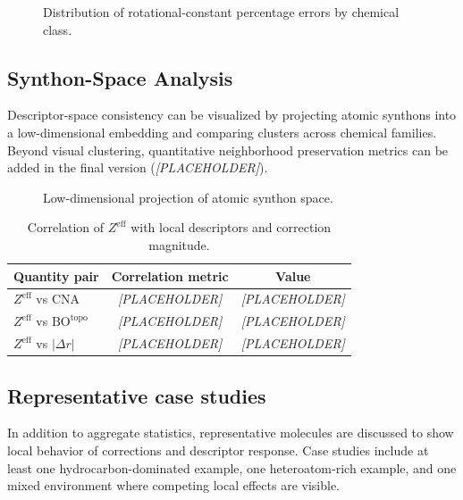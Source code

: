 \documentclass[journal=jctcce,manuscript=article]{achemso}
\begin{document}
\begin{figure}[ht]
\centering
{}
\caption{Distribution of rotational-constant percentage errors by chemical class.}
\label{fig:delta_by_bond_class}
\end{figure}

\subsection{Synthon-Space Analysis}
Descriptor-space consistency can be visualized by projecting atomic synthons into a low-dimensional embedding and comparing clusters across chemical families.
Beyond visual clustering, quantitative neighborhood preservation metrics can be added in the final version (\textit{[PLACEHOLDER]}).

\begin{figure}[ht]
\centering
{}
\caption{Low-dimensional projection of atomic synthon space.}
\label{fig:synthon_embedding}
\end{figure}

\begin{table}[ht]
\caption{Correlation of $Z^{\mathrm{eff}}$ with local descriptors and correction magnitude.}
\label{tab:zeff_correlations}
\centering
\begin{tabular}{lcc}
\toprule
Quantity pair & Correlation metric & Value \\
\midrule
$Z^{\mathrm{eff}}$ vs CNA & \textit{[PLACEHOLDER]} & \textit{[PLACEHOLDER]} \\
$Z^{\mathrm{eff}}$ vs $\mathrm{BO}^{\mathrm{topo}}$ & \textit{[PLACEHOLDER]} & \textit{[PLACEHOLDER]} \\
$Z^{\mathrm{eff}}$ vs $|\Delta r|$ & \textit{[PLACEHOLDER]} & \textit{[PLACEHOLDER]} \\
\bottomrule
\end{tabular}
\end{table}

\subsection{Representative case studies}
In addition to aggregate statistics, representative molecules are discussed to show local behavior of corrections and descriptor response.
Case studies include at least one hydrocarbon-dominated example, one heteroatom-rich example, and one mixed environment where competing local effects are visible.
\end{document}
